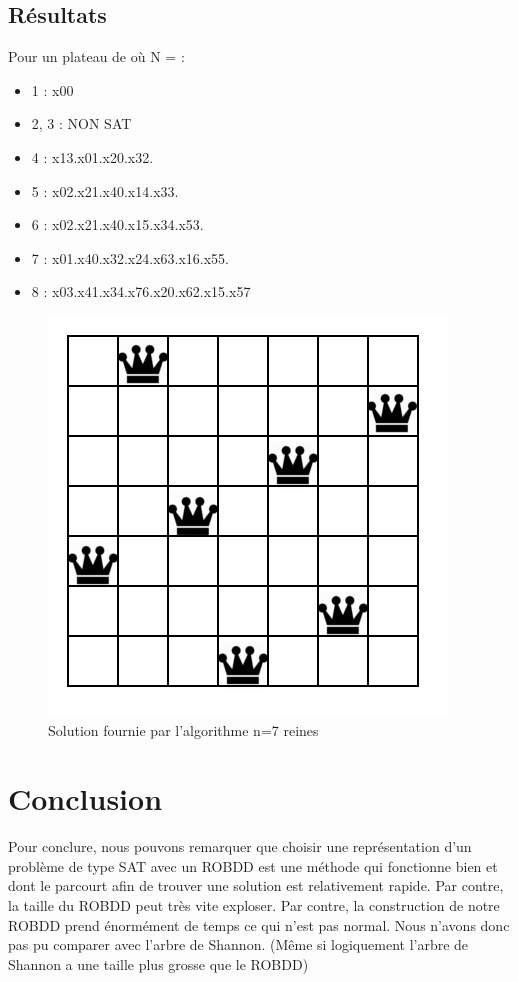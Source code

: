 \documentclass{article}
\begin{document}
\subsection{Résultats}
Pour un plateau de où N = :
\begin{itemize}
  \item 1 : x00
  \item 2, 3 : NON SAT
  \item 4 : x13.x01.x20.x32.
  \item 5 : x02.x21.x40.x14.x33.
  \item 6 : x02.x21.x40.x15.x34.x53.
  \item 7 : x01.x40.x32.x24.x63.x16.x55.
  \item 8 : x03.x41.x34.x76.x20.x62.x15.x57
\end{itemize}
\begin{figure}
	\begin{center}
		\includegraphics[scale=0.7]{sevenkingdom}\\
		Solution fournie par l'algorithme n=7 reines
	\end{center}
\end{figure}
\section{Conclusion}
Pour conclure, nous pouvons remarquer que choisir une représentation d'un problème de type SAT avec un ROBDD est une méthode qui fonctionne bien et dont le parcourt afin de trouver une solution est relativement rapide. Par contre, la taille du ROBDD peut très vite exploser. Par contre, la construction de notre ROBDD prend énormément de temps ce qui n'est pas normal. Nous n'avons donc pas pu comparer avec l'arbre de Shannon. (Même si logiquement l'arbre de Shannon a une taille plus grosse que le ROBDD)
\end{document}
